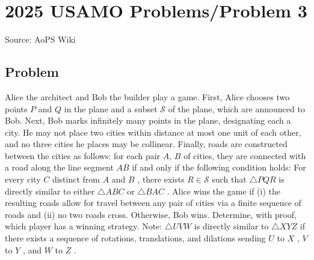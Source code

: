 \documentclass[12pt]{article}
\begin{document}
\section*{{2025 USAMO Problems/Problem 3}}
Source: AoPS Wiki

\subsection*{Problem}
Alice the architect and Bob the builder play a game. First, Alice chooses two points $P$ and $Q$ in the plane and a subset $\mathcal{S}$ of the plane, which are announced to Bob. Next, Bob marks infinitely many points in the plane, designating each a city. He may not place two cities within distance at most one unit of each other, and no three cities he places may be collinear. Finally, roads are constructed between the cities as follows: for each pair $A,\,B$ of cities, they are connected with a road along the line segment $AB$ if and only if the following condition holds: For every city $C$ distinct from $A$ and $B$ , there exists $R\in\mathcal{S}$ such that $\triangle PQR$ is directly similar to either $\triangle ABC$ or $\triangle BAC$ . Alice wins the game if (i) the resulting roads allow for travel between any pair of cities via a finite sequence of roads and (ii) no two roads cross. Otherwise, Bob wins. Determine, with proof, which player has a winning strategy. Note: $\triangle UVW$ is directly similar to $\triangle XYZ$ if there exists a sequence of rotations, translations, and dilations sending $U$ to $X$ , $V$ to $Y$ , and $W$ to $Z$ .
\end{document}
